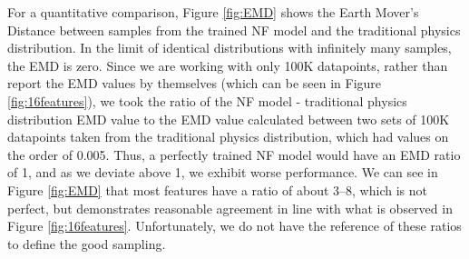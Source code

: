 For a quantitative comparison, Figure \ref{fig:EMD} shows the Earth Mover's Distance between samples from the trained NF model and the traditional physics distribution. In the limit of identical distributions with infinitely many samples, the EMD is zero. Since we are working with only 100K datapoints, rather than report the EMD values by themselves (which can be seen in Figure \ref{fig:16features}), we took the ratio of the NF model - traditional physics distribution EMD value to the EMD value calculated between two sets of 100K datapoints taken from the traditional physics distribution, which had values on the order of 0.005. Thus, a perfectly trained NF model would have an EMD ratio of 1, and as we deviate above 1, we exhibit worse performance. We can see in Figure \ref{fig:EMD} that most features have a ratio of about 3--8, which is not perfect, but demonstrates reasonable agreement in line with what is observed in Figure \ref{fig:16features}. Unfortunately, we do not have the reference of these ratios to define the good sampling.

